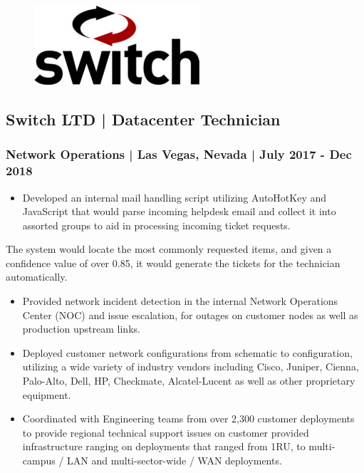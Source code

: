 \documentclass[letter,10pt]{article}
\begin{document}
\begin{figure}
\includegraphics[width=0.8\linewidth]{./img/50p_cr_switch.jpg}
\end{figure}

\subsection*{Switch LTD | Datacenter Technician}
\label{sec:org647c1e5}
\subsubsection*{Network Operations | Las Vegas, Nevada | July 2017 - Dec 2018}
\label{sec:org085615b}
\begin{itemize}
\item Developed an internal mail handling script utilizing AutoHotKey and JavaScript that would parse incoming helpdesk email and collect it into assorted groups to aid in processing incoming ticket requests.
\end{itemize}
The system would locate the most commonly requested items, and given a confidence value of over 0.85, it would generate the tickets for the technician automatically. 
\begin{itemize}
\item Provided network incident detection in the internal Network Operations Center (NOC) and issue escalation, for outages on customer nodes as well as production upstream links.
\item Deployed customer network configurations from schematic to configuration, utilizing a wide variety of industry vendors including Cisco, Juniper, Cienna, Palo-Alto, Dell, HP, Checkmate, Alcatel-Lucent as well as other proprietary equipment.
\item Coordinated with Engineering teams from over 2,300 customer deployments to provide regional technical support issues on customer provided infrastructure ranging on deployments that ranged from 1RU, to multi-campus / LAN and multi-sector-wide / WAN deployments.
\end{itemize}
\end{document}
